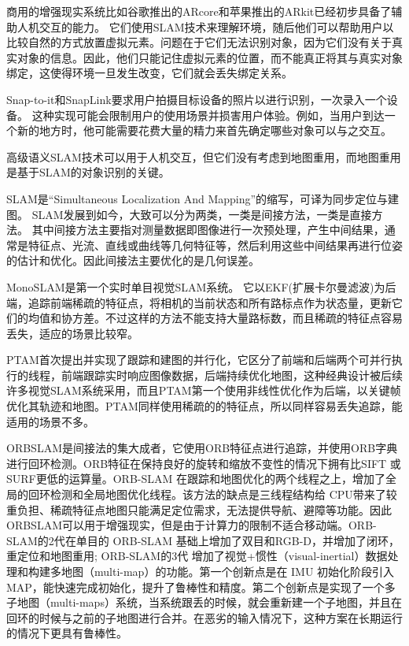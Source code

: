 商用的增强现实系统比如谷歌推出的ARcore\cite{arcore}和苹果推出的ARkit\cite{arkit}已经初步具备了辅助人机交互的能力。
它们使用SLAM技术来理解环境，随后他们可以帮助用户以比较自然的方式放置虚拟元素。问题在于它们无法识别对象，因为它们没有关于真实对象的信息。因此，他们只能记住虚拟元素的位置，而不能真正将其与真实对象绑定，这使得环境一旦发生改变，它们就会丢失绑定关系。

Snap-to-it\cite{de2016snap}和SnapLink\cite{chen2018snaplink}要求用户拍摄目标设备的照片以进行识别，一次录入一个设备。
这种实现可能会限制用户的使用场景并损害用户体验。例如，当用户到达一个新的地方时，他可能需要花费大量的精力来首先确定哪些对象可以与之交互。

高级语义SLAM技术\cite{strecke2019fusion,runz2018maskfusion,salas2013slam++}可以用于人机交互，但它们没有考虑到地图重用，而地图重用是基于SLAM的对象识别的关键。


SLAM是“Simultaneous Localization And Mapping”的缩写，可译为同步定位与建图。
SLAM发展到如今，大致可以分为两类，一类是间接方法，一类是直接方法。
其中间接方法主要指对测量数据即图像进行一次预处理，产生中间结果，通常是特征点、光流、直线或曲线等几何特征等，然后利用这些中间结果再进行位姿的估计和优化。因此间接法主要优化的是几何误差。

MonoSLAM\cite{DavReiMol07}是第一个实时单目视觉SLAM系统。 它以EKF(扩展卡尔曼滤波)为后端，追踪前端稀疏的特征点，将相机的当前状态和所有路标点作为状态量，更新它们的均值和协方差。不过这样的方法不能支持大量路标数，而且稀疏的特征点容易丢失，适应的场景比较窄。

PTAM\cite{KleMur07}首次提出并实现了跟踪和建图的并行化，它区分了前端和后端两个可并行执行的线程，前端跟踪实时响应图像数据，后端持续优化地图，这种经典设计被后续许多视觉SLAM系统采用，而且PTAM第一个使用非线性优化作为后端，以关键帧优化其轨迹和地图。PTAM同样使用稀疏的的特征点，所以同样容易丢失追踪，能适用的场景不多。

ORBSLAM\cite{MurMonTar15}是间接法的集大成者，它使用ORB特征点进行追踪，并使用ORB字典进行回环检测。ORB特征在保持良好的旋转和缩放不变性的情况下拥有比SIFT 或 SURF更低的运算量。ORB-SLAM 在跟踪和地图优化的两个线程之上，增加了全局的回环检测和全局地图优化线程。该方法的缺点是三线程结构给 CPU带来了较重负担、稀疏特征点地图只能满足定位需求，无法提供导航、避障等功能。因此ORBSLAM可以用于增强现实，但是由于计算力的限制不适合移动端。ORB-SLAM的2代\cite{MurTar17}在单目的 ORB-SLAM 基础上增加了双目和RGB-D，并增加了闭环，重定位和地图重用; ORB-SLAM的3代\cite{CamElvRod20} 增加了视觉+惯性（visual-inertial）数据处理和构建多地图（multi-map）的功能。第一个创新点是在 IMU 初始化阶段引入 MAP，能快速完成初始化，提升了鲁棒性和精度。第二个创新点是实现了一个多子地图（multi-maps）系统，当系统跟丢的时候，就会重新建一个子地图，并且在回环的时候与之前的子地图进行合并。在恶劣的输入情况下，这种方案在长期运行的情况下更具有鲁棒性。

